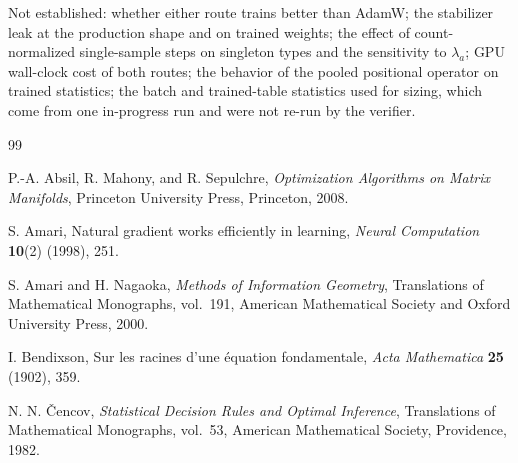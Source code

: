 \documentclass[11pt]{article}
\theoremstyle{definition}
\theoremstyle{remark}
\newcommand{\ndash}{\textendash}
\begin{document}
Not established: whether either route trains better than AdamW; the stabilizer leak at the production shape and on trained weights; the effect of count-normalized single-sample steps on singleton types and the sensitivity to $\lambda_a$; GPU wall-clock cost of both routes; the behavior of the pooled positional operator on trained statistics; the batch and trained-table statistics used for sizing, which come from one in-progress run and were not re-run by the verifier.

\begin{thebibliography}{99}

P.-A. Absil, R. Mahony, and R. Sepulchre, \emph{Optimization Algorithms on Matrix Manifolds}, Princeton University Press, Princeton, 2008.

S. Amari, Natural gradient works efficiently in learning, \emph{Neural Computation} \textbf{10}(2) (1998), 251\ndash 276.

S. Amari and H. Nagaoka, \emph{Methods of Information Geometry}, Translations of Mathematical Monographs, vol.~191, American Mathematical Society and Oxford University Press, 2000.

I. Bendixson, Sur les racines d'une \'equation fondamentale, \emph{Acta Mathematica} \textbf{25} (1902), 359\ndash 365.

N. N. \v{C}encov, \emph{Statistical Decision Rules and Optimal Inference}, Translations of Mathematical Monographs, vol.~53, American Mathematical Society, Providence, 1982.


\end{thebibliography}
\end{document}
